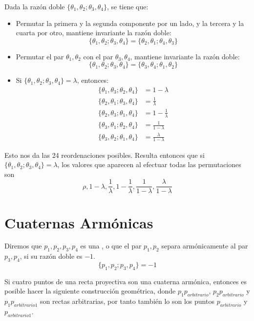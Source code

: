 Dada la razón doble $\{\theta_1,\theta_2;\theta_3,\theta_4\}$, se tiene que:
\begin{itemize}
	\item Permutar la primera y la segunda componente por un lado, y la tercera y la cuarta por otro, mantiene invariante la razón doble: \[\{\theta_1,\theta_2;\theta_3,\theta_4\}=\{\theta_2,\theta_1;\theta_4,\theta_3\}\]
	
	\item Permutar el par $\theta_1,\theta_2$ con el par $\theta_3,\theta_4$, mantiene invariante la razón doble: \[\{\theta_1,\theta_2;\theta_3,\theta_4\}=\{\theta_3,\theta_4;\theta_1,\theta_2\}\]
	
	\item Si $\{\theta_1,\theta_2;\theta_3,\theta_4\}=\lambda$, entonces:
	\begin{equation*}
		\begin{split}
			\{\theta_1,\theta_3;\theta_2,\theta_4\}&=1-\lambda\\
			\{\theta_2,\theta_1;\theta_3,\theta_4\}&=\frac{1}{\lambda}\\
			\{\theta_2,\theta_3;\theta_1,\theta_4\}&=1-\frac{1}{\lambda}\\
			\{\theta_3,\theta_1;\theta_2,\theta_4\}&=\frac{1}{1-\lambda}\\
			\{\theta_3,\theta_2;\theta_1,\theta_4\}&=\frac{\lambda}{1-\lambda}
		\end{split}
	\end{equation*}
\end{itemize}
Esto nos da las 24 reordenaciones posibles. Resulta entonces que si $\{\theta_1,\theta_2;\theta_3,\theta_4\}=\lambda$, los valores que aparecen al efectuar todas las permutaciones son 
\[\rho,1-\lambda,\frac{1}{\lambda},1-\frac{1}{\lambda},\frac{1}{1-\lambda},\frac{\lambda}{1-\lambda}\]
\section{Cuaternas Armónicas}
\begin{defi}
	Diremos que $p_1,p_2,p_3,p_4$ es una , o que el par $p_1,p_2$ separa armónicamente al par $p_3,p_4$, si su razón doble es $-1$.
	\begin{equation}
		\{p_1,p_2;p_3,p_4\}=-1
	\end{equation}
\end{defi}
Si cuatro puntos de una recta proyectiva son una cuaterna armónica, entonces es posible hacer la siguiente construcción geométrica, donde $p_1p_{arbitrario}$, $p_2p_{arbitrario}$ y $p_1p_{arbitrario1}$ son rectas arbitrarias, por tanto también lo son los puntos $p_{arbitrario}$ y $p_{arbitrario1}$.

